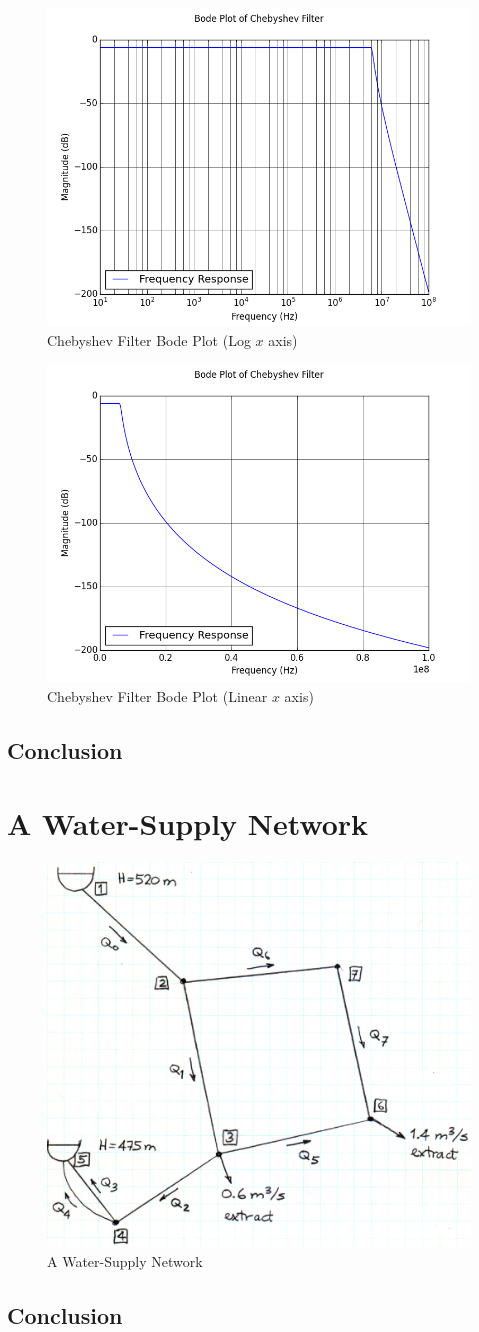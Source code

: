 \documentclass[11pt,a4paper]{article}
\begin{document}
\begin{figure}[h]
	\centering
	\includegraphics[width=0.5\linewidth]{Images/Bode_SemiLogX.png}
	\caption{Chebyshev Filter Bode Plot (Log $x$ axis)}
	\label{fig:Bode_SemiLogX}
\end{figure}

\begin{figure}[h]
	\centering
	\includegraphics[width=0.5\linewidth]{Images/Bode_Linear.png}
	\caption{Chebyshev Filter Bode Plot (Linear $x$ axis)}
	\label{fig:Bode_Linear}
\end{figure}

\subsection{Conclusion}

\newpage

\section{A Water-Supply Network} \label{sec:pipes}

\medskip
\begin{figure}[h]
	\centering	\includegraphics[width=0.6\linewidth]{Images/PipeNetwork.png}
	\caption{A Water-Supply Network}
	\label{fig:PipeNetwork}
\end{figure}

\subsection{Conclusion}
\end{document}
